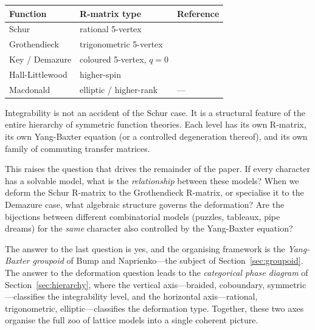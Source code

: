 \begin{center}
\renewcommand{\arraystretch}{1.3}
\begin{tabular}{lll}
\toprule
\textbf{Function} & \textbf{R-matrix type} & \textbf{Reference} \\
\midrule
Schur & rational 5-vertex & \cite{zinn-justin-2008} \\
Grothendieck & trigonometric 5-vertex & \cite{wheeler-zinn-justin-2016} \\
Key / Demazure & coloured 5-vertex, $q=0$ & \cite{yang-2025, brubaker-bump-buciumas-gustafsson-2021} \\
Hall-Littlewood & higher-spin & \cite{wheeler-zinn-justin-2025} \\
Macdonald & elliptic / higher-rank & --- \\
\bottomrule
\end{tabular}
\end{center}

Integrability is not an accident of the Schur case.  It is a
structural feature of the entire hierarchy of symmetric function
theories.  Each level has its own R-matrix, its own Yang-Baxter
equation (or a controlled degeneration thereof), and its own family of
commuting transfer matrices.

This raises the question that drives the remainder of the paper.  If
every character has a solvable model, what is the
\emph{relationship} between these models?  When we deform the Schur
R-matrix to the Grothendieck R-matrix, or specialise it to the
Demazure case, what algebraic structure governs the deformation?  Are
the bijections between different combinatorial models (puzzles,
tableaux, pipe dreams) for the \emph{same} character also controlled
by the Yang-Baxter equation?

The answer to the last question is yes, and the organising framework
is the \emph{Yang-Baxter groupoid} of Bump and Naprienko---the
subject of Section~\ref{sec:groupoid}.  The answer to the
deformation question leads to the \emph{categorical phase diagram} of
Section~\ref{sec:hierarchy}, where the vertical axis---braided,
coboundary, symmetric---classifies the integrability level, and the
horizontal axis---rational, trigonometric, elliptic---classifies the
deformation type.  Together, these two axes organise the full zoo of
lattice models into a single coherent picture.
